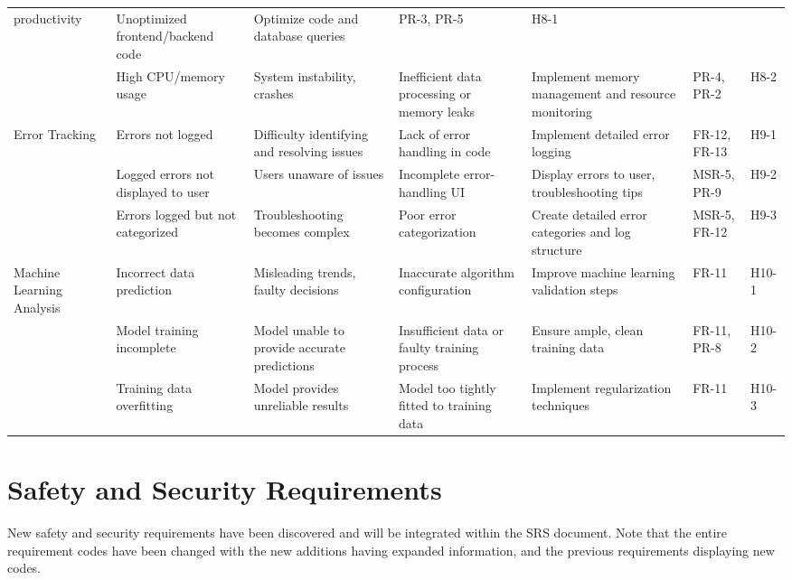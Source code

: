 \documentclass{article}
\begin{document}
\begin{landscape}
\begin{longtable}{|p{2.5cm}|p{4cm}|p{4cm}|p{4cm}|p{4cm}|p{1.25cm}|p{1cm}|}
        productivity & Unoptimized frontend/backend code & Optimize code and
        database queries & PR-3, PR-5 & H8-1 \\
        \cline{2-7}
        \texttt{} & High CPU/memory usage & System instability, crashes &
        Inefficient data processing or memory leaks & Implement memory
        management and resource monitoring & PR-4, PR-2 & H8-2 \\
        \cline{1-7}
        Error Tracking & Errors not logged & Difficulty identifying and
        resolving issues & Lack of error handling in code & Implement detailed
        error logging & FR-12, FR-13 & H9-1 \\
        \cline{2-7}
        \texttt{} & Logged errors not displayed to user & Users unaware of
        issues & Incomplete error-handling UI & Display errors to user,
        troubleshooting tips & MSR-5, PR-9 & H9-2 \\
        \cline{2-7}
        \texttt{} & Errors logged but not categorized & Troubleshooting becomes
        complex & Poor error categorization & Create detailed error categories
        and log structure & MSR-5, FR-12 & H9-3 \\
        \cline{1-7}
        Machine Learning Analysis & Incorrect data prediction & Misleading
        trends, faulty decisions & Inaccurate algorithm configuration & Improve
        machine learning validation steps & FR-11 & H10-1 \\
        \cline{2-7}
        \texttt{} & Model training incomplete & Model unable to provide accurate
        predictions & Insufficient data or faulty training process & Ensure
        ample, clean training data & FR-11, PR-8 & H10-2 \\
        \cline{2-7}
        \texttt{} & Training data overfitting & Model provides unreliable
        results & Model too tightly fitted to training data & Implement
        regularization techniques & FR-11 & H10-3 \\
        
    \end{longtable}
\end{landscape}

\restoregeometry

\section{Safety and Security Requirements}
New safety and security requirements have been discovered and will be integrated
within the SRS document. Note that the entire requirement codes have been
changed with the new additions having expanded information, and the previous
requirements displaying new codes.
\end{document}
